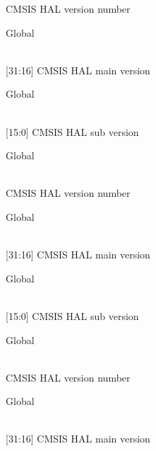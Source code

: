 \begin{DoxyRefList}
CMSIS HAL version number  
\item[{\parbox[t]{\linewidth}{Global \doxylink{core__cm3_8h_ac1c1120e9fe082fac8225c60143ac79a}{\+\_\+\+\_\+\+CM3\+\_\+\+CMSIS\+\_\+\+VERSION\+\_\+\+MAIN} }}]\hfill \\
\label{deprecated__deprecated000294}%
%
\mbox{[}31\+:16\mbox{]} CMSIS HAL main version  
\item[{\parbox[t]{\linewidth}{Global \doxylink{core__cm3_8h_a9ff7a998d4b8b3c87bfaca6e78607950}{\+\_\+\+\_\+\+CM3\+\_\+\+CMSIS\+\_\+\+VERSION\+\_\+\+SUB} }}]\hfill \\
\label{deprecated__deprecated000295}%
%
\mbox{[}15\+:0\mbox{]} CMSIS HAL sub version  
\item[{\parbox[t]{\linewidth}{Global \doxylink{core__cm4_8h_acb6f5d2c3271c95d0a02fd06723af25d}{\+\_\+\+\_\+\+CM4\+\_\+\+CMSIS\+\_\+\+VERSION} }}]\hfill \\
\label{deprecated__deprecated000451}%
%
CMSIS HAL version number  
\item[{\parbox[t]{\linewidth}{Global \doxylink{core__cm4_8h_a90ffc8179476f80347379bfe29639edc}{\+\_\+\+\_\+\+CM4\+\_\+\+CMSIS\+\_\+\+VERSION\+\_\+\+MAIN} }}]\hfill \\
\label{deprecated__deprecated000449}%
%
\mbox{[}31\+:16\mbox{]} CMSIS HAL main version  
\item[{\parbox[t]{\linewidth}{Global \doxylink{core__cm4_8h_afc7392964da961a44e916fcff7add532}{\+\_\+\+\_\+\+CM4\+\_\+\+CMSIS\+\_\+\+VERSION\+\_\+\+SUB} }}]\hfill \\
\label{deprecated__deprecated000450}%
%
\mbox{[}15\+:0\mbox{]} CMSIS HAL sub version  
\item[{\parbox[t]{\linewidth}{Global \doxylink{core__cm55_8h_a98da26facda44ee0bf050130915f74bd}{\+\_\+\+\_\+\+CM55\+\_\+\+CMSIS\+\_\+\+VERSION} }}]\hfill \\
\label{deprecated__deprecated000454}%
%
CMSIS HAL version number  
\item[{\parbox[t]{\linewidth}{Global \doxylink{core__cm55_8h_ae9538da6d45e32c052dbc041ea42e17f}{\+\_\+\+\_\+\+CM55\+\_\+\+CMSIS\+\_\+\+VERSION\+\_\+\+MAIN} }}]\hfill \\
\label{deprecated__deprecated000452}%
%
\mbox{[}31\+:16\mbox{]} CMSIS HAL main version  

\end{DoxyRefList}
